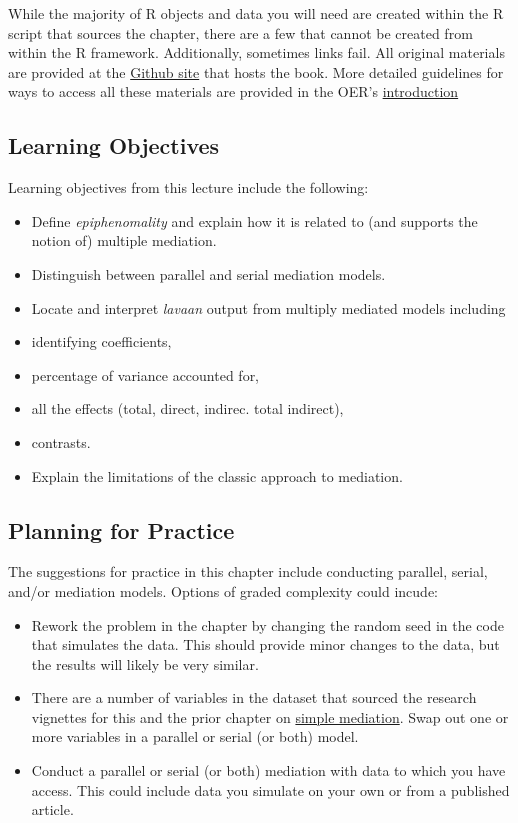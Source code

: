 \documentclass[
  english,
]{book}
\providecommand{\tightlist}{%
  \setlength{\itemsep}{0pt}\setlength{\parskip}{0pt}}
\begin{document}
While the majority of R objects and data you will need are created within the R script that sources the chapter, there are a few that cannot be created from within the R framework. Additionally, sometimes links fail. All original materials are provided at the \href{https://https://github.com/lhbikos/ReC_MultivModel}{Github site} that hosts the book. More detailed guidelines for ways to access all these materials are provided in the OER's \protect\hyperlink{ReCintro}{introduction}

\hypertarget{learning-objectives-5}{%
\subsection{Learning Objectives}\label{learning-objectives-5}}

Learning objectives from this lecture include the following:

\begin{itemize}
\tightlist
\item
  Define \emph{epiphenomality} and explain how it is related to (and supports the notion of) multiple mediation.
\item
  Distinguish between parallel and serial mediation models.
\item
  Locate and interpret \emph{lavaan} output from multiply mediated models including
\item
  identifying coefficients,
\item
  percentage of variance accounted for,\\
\item
  all the effects (total, direct, indirec. total indirect),
\item
  contrasts.
\item
  Explain the limitations of the classic approach \citep{baron_moderator-mediator_1986} to mediation.
\end{itemize}

\hypertarget{planning-for-practice-5}{%
\subsection{Planning for Practice}\label{planning-for-practice-5}}

The suggestions for practice in this chapter include conducting parallel, serial, and/or mediation models. Options of graded complexity could incude:

\begin{itemize}
\tightlist
\item
  Rework the problem in the chapter by changing the random seed in the code that simulates the data. This should provide minor changes to the data, but the results will likely be very similar.
\item
  There are a number of variables in the dataset that sourced the research vignettes for this and the prior chapter on \protect\hyperlink{SimpleMed}{simple mediation}. Swap out one or more variables in a parallel or serial (or both) model.
\item
  Conduct a parallel or serial (or both) mediation with data to which you have access. This could include data you simulate on your own or from a published article.
\end{itemize}
\end{document}

